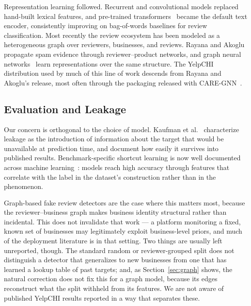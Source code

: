 \documentclass[conference]{IEEEtran}
\begin{document}
Representation learning followed. Recurrent and convolutional models replaced
hand-built lexical features, and pre-trained transformers~\cite{devlin2019bert,
liu2019roberta} became the default text encoder, consistently improving on
bag-of-words baselines for review classification. Most recently the review
ecosystem has been modeled as a heterogeneous graph over reviewers, businesses,
and reviews. Rayana and Akoglu~\cite{rayana2015collective} propagate spam
evidence through reviewer--product networks, and graph neural
networks~\cite{kipf2017semi, dou2020enhancing} learn representations over the
same structure. The YelpCHI distribution used by much of this line of work
descends from Rayana and Akoglu's release, most often through the packaging
released with CARE-GNN~\cite{dou2020enhancing}.

\subsection{Evaluation and Leakage}

Our concern is orthogonal to the choice of model. Kaufman et
al.~\cite{kaufman2012leakage} characterize leakage as the introduction of
information about the target that would be unavailable at prediction time, and
document how easily it survives into published results. Benchmark-specific
shortcut learning is now well documented across machine
learning~\cite{geirhos2020shortcut}: models reach high accuracy through features
that correlate with the label in the dataset's construction rather than in the
phenomenon.

Graph-based fake review detectors are the case where this matters most, because
the reviewer--business graph makes business identity structural rather than
incidental. This does not invalidate that work --- a platform monitoring a
fixed, known set of businesses may legitimately exploit business-level priors,
and much of the deployment literature is in that setting. Two things are
usually left unreported, though. The standard random or reviewer-grouped split
does not distinguish a detector that generalizes to new businesses from one that
has learned a lookup table of past targets; and, as Section~\ref{sec:graph}
shows, the natural correction does not fix this for a graph model, because its
edges reconstruct what the split withheld from its features. We are not aware of
published YelpCHI results reported in a way that separates these.

\end{document}
